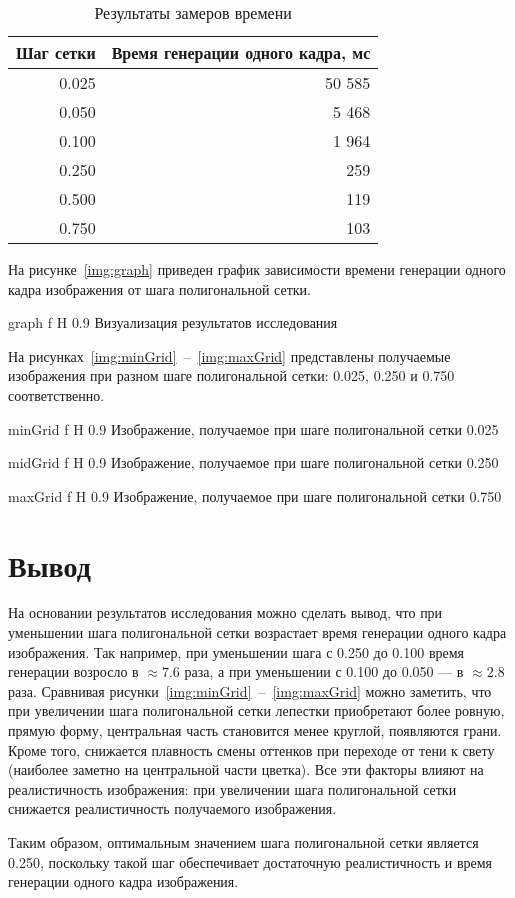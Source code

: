 \begin{table}[H]
	\begin{center}
		\captionsetup{justification=raggedright, singlelinecheck=off}
		\caption{Результаты замеров времени}
		\label{tbl:mes}
		\begin{tabular}{|r|r|}
			\hline
			Шаг сетки & Время генерации одного кадра, мс\\
			\hline
			0.025 & 50 585\\
			\hline
			0.050 & 5 468 \\
			\hline
			0.100 & 1 964\\
			\hline
			0.250 & 259\\
			\hline
			0.500 & 119\\
			\hline
			0.750 & 103\\
			\hline
		\end{tabular}
	\end{center}
\end{table}

На рисунке~\ref{img:graph} приведен график зависимости времени генерации одного кадра изображения от шага полигональной сетки.

{graph} 
{f}
{H}
{0.9\textwidth} 
{Визуализация результатов исследования} 

На рисунках~\ref{img:minGrid}~--~\ref{img:maxGrid} представлены получаемые изображения при разном шаге полигональной сетки: 0.025, 0.250 и 0.750 соответственно.

{minGrid} 
{f}
{H}
{0.9\textwidth} 
{Изображение, получаемое при шаге полигональной сетки 0.025} 

{midGrid} 
{f}
{H}
{0.9\textwidth} 
{Изображение, получаемое при шаге полигональной сетки 0.250} 

{maxGrid} 
{f}
{H}
{0.9\textwidth} 
{Изображение, получаемое при шаге полигональной сетки 0.750} 


\section*{Вывод}

На основании результатов исследования можно сделать вывод, что при уменьшении шага полигональной сетки возрастает время генерации одного кадра изображения. Так например, при уменьшении шага с 0.250 до 0.100 время генерации возросло в $\approx 7.6$ раза, а при уменьшении с 0.100 до 0.050 --- в $\approx 2.8$ раза.
Сравнивая рисунки~\ref{img:minGrid}~--~\ref{img:maxGrid} можно заметить, что при увеличении шага полигональной сетки лепестки приобретают более ровную, прямую форму, центральная часть становится менее круглой, появляются грани. Кроме того, снижается плавность смены оттенков при переходе от тени к свету (наиболее заметно на центральной части цветка). Все эти факторы влияют на реалистичность изображения: при увеличении шага полигональной сетки снижается реалистичность получаемого изображения.

Таким образом, оптимальным значением шага полигональной сетки является 0.250, поскольку такой шаг обеспечивает достаточную реалистичность и время генерации одного кадра изображения.

